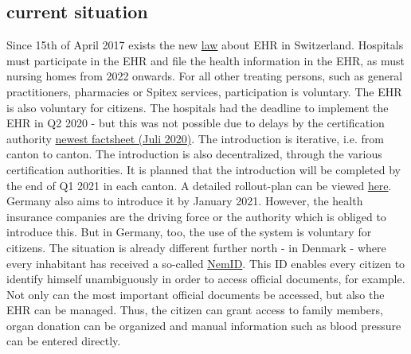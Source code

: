\documentclass{report}
\begin{document}
\subsection*{current situation}
Since 15th of April 2017 exists the new \href{https://www.bag.admin.ch/bag/de/home/gesetze-und-bewilligungen/gesetzgebung/gesetzgebung-mensch-gesundheit/gesetzgebung-elektronisches-patientendossier.html}{law} 
about EHR in Switzerland. Hospitals must participate in the EHR and file the health information in the EHR, 
as must nursing homes from 2022 onwards. For all other treating persons, such as general practitioners, 
pharmacies or Spitex services, participation is voluntary. The EHR is also voluntary for citizens.
The hospitals had the deadline to implement the EHR in Q2 2020 - but this was not possible due to delays by the certification authority \href{https://www.e-health-suisse.ch/fileadmin/user_upload/Dokumente/D/factsheet-epd-einfuehrung.pdf}{newest factsheet (Juli 2020)}.
The introduction is iterative, i.e. from canton to canton. The introduction is also decentralized, through the various certification authorities. It is planned that the introduction will be completed by the end of Q1 2021 in each canton. 
A detailed rollout-plan can be viewed \href{https://www.e-health-suisse.ch/fileadmin/user_upload/Dokumente/D/einfuehrungsplan-epd-big-picture.pdf}{here}. \newline
\newline
Germany also aims to introduce it by January 2021. However, the health insurance companies are the driving force or the authority which is obliged to introduce this. 
But in Germany, too, the use of the system is voluntary for citizens. 
\newline
The situation is already different further north - in Denmark - where every inhabitant has received a so-called \href{https://www.handelskraft.com/digital-patient-records-the-danish-example/2019/03/}{NemID}. 
This ID enables every citizen to identify himself unambiguously in order to access official documents, for example. 
Not only can the most important official documents be accessed, but also the EHR can be managed. 
Thus, the citizen can grant access to family members, organ donation can be organized and manual information such as blood pressure 
can be entered directly.
\end{document}
